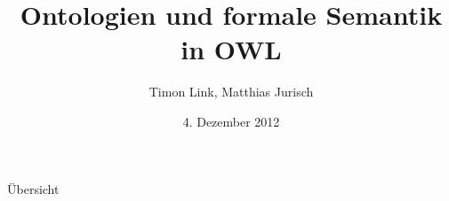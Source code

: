 \documentclass{beamer}
\title[OWL]{Ontologien und formale Semantik in OWL}
\author{Timon Link, Matthias Jurisch}
\date{4. Dezember 2012}
\begin{document}
\begin{frame}
\titlepage
\end{frame}

\begin{frame}{Übersicht}
\end{frame}








\end{document}

